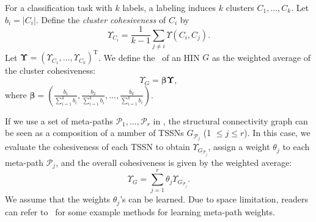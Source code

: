 For a classification task with $k$ labels, 
a labeling induces $k$ clusters $C_1, ..., C_k$.
Let $b_i = |C_i|$.
Define the \emph{cluster cohesiveness} of $C_i$ by
\begin{equation}
\label{eq:cluster_cohesiveness}
\Upsilon_{C_i} = \frac{1}{k-1}\sum_{j\neq i}\Upsilon(C_i, C_j).
\end{equation}
Let $\bm{\Upsilon} = (\Upsilon_{C_1}, ..., \Upsilon_{C_k})^\mathrm{T}$. 
We define the \chn\ of an HIN $G$ as the weighted average of the cluster cohesiveness:
\begin{equation}
\label{eq:subnetwork_cohesiveness}
\Upsilon_{G} = \bm{\beta}\bm{\Upsilon},
\end{equation}
where $\bm{\beta} = (\frac{b_1}{\sum_{i=1}^k b_i}, \frac{b_2}{\sum_{i=1}^k b_i}, ..., \frac{b_k}{\sum_{i=1}^k b_i})$.

If we use a set of meta-paths $\mathcal{P}_1, ..., \mathcal{P}_r$ in \tc, the structural connectivity graph can be seen as a composition of 
a number of TSSNs $G_{\mathcal{P}_j}$ (1 $\leq j \leq r$).
In this case, we evaluate the cohesiveness of each TSSN to obtain $\Upsilon_{G_{\mathcal{P}_j}}$,
assign a weight $\theta_j$ to each meta-path $\mathcal{P}_j$, and the overall
cohesiveness is given by the weighted average:
\begin{equation}
\Upsilon_{G} = \sum_{j=1}^r \theta_j \Upsilon_{G_{\mathcal{P}_j}}.
\end{equation}
We assume that the weights $\theta_j$'s can be learned. 
Due to space limitation,
readers can refer to~\cite{DBLP:dblp_conf/ecir/LuoGWL14,DBLP:dblp_conf/sdm/WanOKH15,DBLP:dblp_conf/cikm/WanLKYGCH15} for some example methods for learning meta-path weights.

